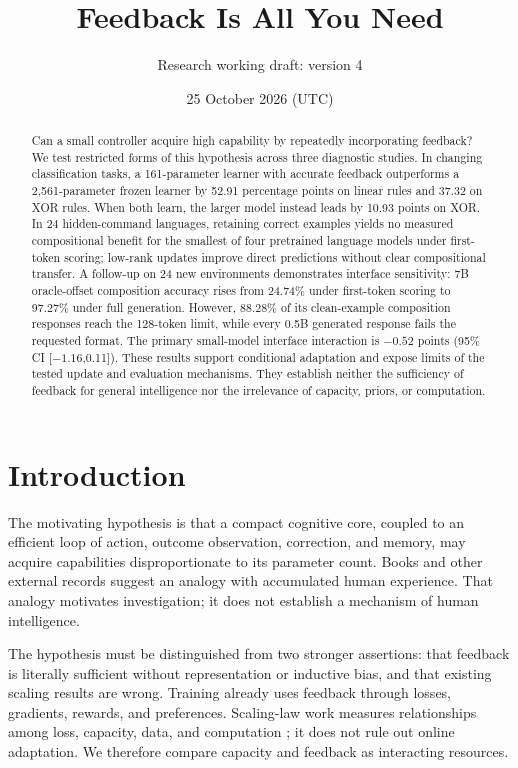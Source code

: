 \documentclass[11pt]{article}
\title{Feedback Is All You Need}
\author{Research working draft: version 4}
\date{25 October 2026 (UTC)}
\begin{document}
\maketitle
\begin{abstract}
Can a small controller acquire high capability by repeatedly incorporating
feedback? We test restricted forms of this hypothesis across three diagnostic
studies. In changing classification tasks, a 161-parameter learner with
accurate feedback outperforms a 2,561-parameter frozen learner by 52.91
percentage points on linear rules and 37.32 on XOR rules. When both learn,
the larger model instead leads by 10.93 points on XOR. In 24 hidden-command
languages, retaining correct examples yields no measured compositional benefit
for the smallest of four pretrained language models under first-token scoring;
low-rank updates improve direct predictions without clear compositional
transfer. A follow-up on 24 new environments demonstrates interface sensitivity:
7B oracle-offset composition accuracy rises from 24.74\% under first-token
scoring to 97.27\% under full generation. However, 88.28\% of its clean-example
composition responses reach the 128-token limit, while every 0.5B generated
response fails the requested format. The primary small-model interface
interaction is $-0.52$ points (95\% CI [$-1.16$,0.11]). These results support
conditional adaptation and expose limits of the tested update and evaluation
mechanisms. They establish neither the sufficiency of feedback for general
intelligence nor the irrelevance of capacity, priors, or computation.
\end{abstract}

\section{Introduction}
The motivating hypothesis is that a compact cognitive core, coupled to an
efficient loop of action, outcome observation, correction, and memory, may
acquire capabilities disproportionate to its parameter count. Books and other
external records suggest an analogy with accumulated human experience. That
analogy motivates investigation; it does not establish a mechanism of human
intelligence.

The hypothesis must be distinguished from two stronger assertions: that
feedback is literally sufficient without representation or inductive bias,
and that existing scaling results are wrong. Training already uses feedback
through losses, gradients, rewards, and preferences. Scaling-law work measures
relationships among loss, capacity, data, and computation \cite{kaplan,hoffmann};
it does not rule out online adaptation. We therefore compare capacity and
feedback as interacting resources.
\end{document}
